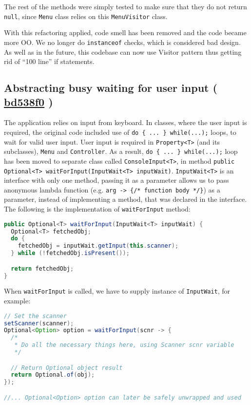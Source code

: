 \documentclass{article}
\newcommand{\code}[1]{\texttt{#1}}
\newcommand{\gh}[1]{%
  \href{https://github.com/awave1/assessment-loan-system/commit/#1}{#1}%
}
\begin{document}
\noindent The rest of the methods were simply tested to make sure that they do not return \code{null}, since \code{Menu} class relies on this \code{MenuVisitor} class.

With this refactoring applied, code smell has been removed and the code became more OO. We no longer do \code{instanceof} checks, which is considered bad design. As well as in the future, this codebase can now use Visitor pattern thus getting rid of ``100 line'' if statements.

\subsection*{Abstracting busy waiting for user input (\gh{bd538f0})}
The application relies on input from keyboard. In classes, where the user input is required, the original code included use of \code{do \{ ... \} while(...);} loops, to wait for valid user input. User input is required in \code{Property<T>} (and its subclasses), \code{Menu} and \code{Controller}. As a result, \code{do \{ ... \} while(...);} loop has been moved to separate class called \code{ConsoleInput<T>}, in method \code{public Optional<T> waitForInput(InputWait<T> inputWait)}. \code{InputWait<T>} is an interface with only one method, passing it as a parameter allows us to pass anonymous lambda function (e.g. \code{arg -> \{/* function body */\}}) as a parameter, instead of implementing a method, that was declared in the interface. The following is the implementation of \code{waitForInput} method:

\begin{lstlisting}[language=Java]
public Optional<T> waitForInput(InputWait<T> inputWait) {
  Optional<T> fetchedObj;
  do {
    fetchedObj = inputWait.getInput(this.scanner);
  } while (!fetchedObj.isPresent());

  return fetchedObj;
}
\end{lstlisting}

When \code{waitForInput} is called, we have to supply instance of \code{InputWait}, for example:

\begin{lstlisting}[language=Java]
// Set the scanner
setScanner(scanner);
Optional<Option> option = waitForInput(scnr -> {
  /*
   * Do all the necessary things here, using Scanner scnr variable
   */

  // Return Optional object result
  return Optional.of(obj);
});

//... Optional<Option> option can later be safely unwrapped and used
\end{lstlisting}
\end{document}
